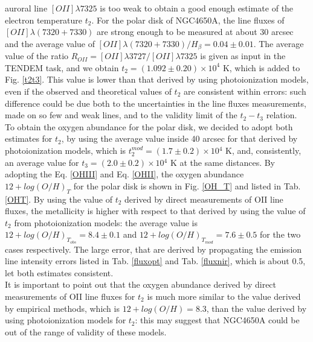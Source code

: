 \documentclass[12pt,preprint]{aastex}
\begin{document}
auroral line $[OII]\lambda7325$ is too weak to obtain a good enough
estimate of the electron temperature $t_2$. For the polar disk of
NGC4650A, the line fluxes of $[OII]\lambda(7320+7330)$ are strong enough
to be measured at about 30 arcsec and the average value of
$[OII]\lambda(7320+7330)/H_{\beta} = 0.04 \pm 0.01$. The average value
of the ratio $R_{OII} = [OII]\lambda3727/[OII]\lambda7325$ is given as input in the
TENDEM task, and we obtain $t_2 = (1.092 \pm 0.20) \times 10^{4}$ K,
which is added to Fig. \ref{t2t3}. This value is lower than that
derived by using photoionization models, even if the observed and
theoretical values of $t_2$ are consistent within errors: such
difference could be due both to the uncertainties in the line fluxes
measurements, made on so few and weak lines, and to the validity limit
of the $t_2 - t_3$ relation.\\ To obtain the oxygen abundance for the
polar disk, we decided to adopt both estimates for $t_2$, by using the
average value inside 40 arcsec for that derived by photoionization
models, which is $t_2^{mod} = (1.7 \pm 0.2) \times 10{^4}$ K, and,
consistently, an average value for $t_3 = (2.0 \pm 0.2) \times 10{^4}$
K at the same distances.  By adopting the Eq. \ref{OHIII} and
Eq. \ref{OHII}, the oxygen abundance $12+log(O/H)_{T}$ for the polar
disk is shown in Fig. \ref{OH_T} and listed in Tab. \ref{OHT}. By
using the value of $t_2$ derived by direct measurements of OII line
fluxes, the metallicity is higher with respect to that derived by
using the value of $t_2$ from photoionization models: the average
value is $12+log(O/H)_{T_{obs}} = 8.4 \pm 0.1$ and
$12+log(O/H)_{T_{mod}} = 7.6 \pm 0.5$ for the two cases respectively.
The large error, that are derived by propagating the emission line
intensity errors listed in Tab. \ref{fluxopt} and Tab. \ref{fluxnir},
which is about 0.5, let both estimates consistent.\\ It is important
to point out that the oxygen abundance derived by direct measurements
of OII line fluxes for $t_2$ is much more similar to the value derived
by empirical methods, which is $12+log(O/H) = 8.3$, than the value
derived by using photoionization models for $t_2$: this may suggest
that NGC4650A could be out of the range of validity of these models.



\end{document}
